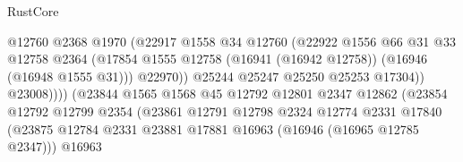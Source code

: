 \begin{lexlean}{RustCore}
\begin{coremodule}
                                            @12760
                                            @2368
                                            @1970
                                            (@22917
                                              @1558
                                              @34
                                              @12760
                                              (@22922
                                                @1556
                                                @66
                                                @31
                                                @33
                                                @12758
                                                @2364
                                                (@17854
                                                  @1555
                                                  @12758
                                                  (@16941 (@16942 @12758))
                                                  (@16946 (@16948 @1555 @31)))
                                                @22970))
                                            @25244
                                            @25247
                                            @25250
                                            @25253
                                            @17304))
                                        @23008))))
                                (@23844
                                  @1565
                                  @1568
                                  @45
                                  @12792
                                  @12801
                                  @2347
                                  @12862
                                  (@23854
                                    @12792
                                    @12799
                                    @2354
                                    (@23861
                                      @12791
                                      @12798
                                      @2324
                                      @12774
                                      @2331
                                      @17840
                                      (@23875
                                        @12784
                                        @2331
                                        @23881
                                        @17881
                                        @16963
                                        (@16946 (@16965 @12785 @2347)))
                                      @16963

\end{coremodule}
\end{lexlean}
